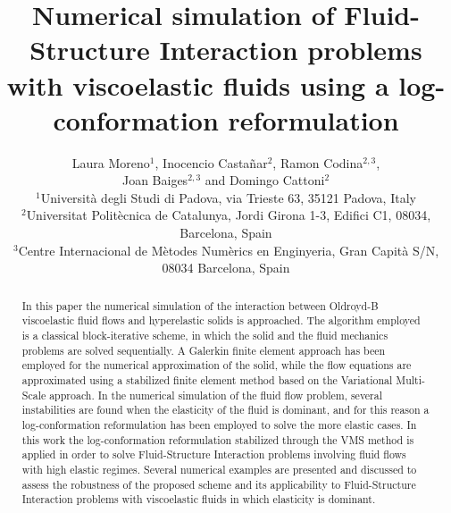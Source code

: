 \documentclass[11pt,english]{article}
\begin{document}
\title{Numerical simulation of Fluid-Structure Interaction problems with viscoelastic fluids using a log-conformation reformulation}
\author{Laura Moreno$^1$, Inocencio Casta\~nar$^2$, Ramon Codina$^{2,3}$,\\ Joan Baiges$^{2,3}$ and Domingo Cattoni$^{2}$\\ 
{\footnotesize{}{}$^{1}$Universit\`a degli Studi di Padova, via Trieste 63, 35121 Padova, Italy}\\
 {\footnotesize{}{}$^{2}$Universitat Polit\`ecnica de Catalunya, Jordi Girona 1-3, Edifici C1, 08034, Barcelona, Spain}\\
 {\footnotesize{}{}$^{3}$Centre Internacional de M\`etodes Num\`erics en Enginyeria, Gran Capit\`a S/N, 08034 Barcelona, Spain}
}
\maketitle
\begin{abstract}
In this paper the numerical simulation of the interaction between Oldroyd-B viscoelastic fluid flows and hyperelastic solids is approached. The algorithm employed is a classical block-iterative scheme, in which the solid and the fluid mechanics problems are solved sequentially. A Galerkin finite element approach has been employed for the numerical approximation of the solid, while the flow equations are approximated using a stabilized finite element method based on the Variational Multi-Scale approach. In the numerical simulation of the fluid flow problem, several instabilities are found when the elasticity of the fluid is dominant, and for this reason a log-conformation reformulation has been employed to solve the more elastic cases. In this work the log-conformation reformulation stabilized through the VMS method is applied in order to solve Fluid-Structure Interaction problems involving fluid flows with high elastic regimes. Several numerical examples are presented and discussed to assess the robustness of the proposed scheme and its applicability to Fluid-Structure Interaction problems with viscoelastic fluids in which elasticity is dominant.
\end{abstract}

\maketitle
{}
\end{document}

